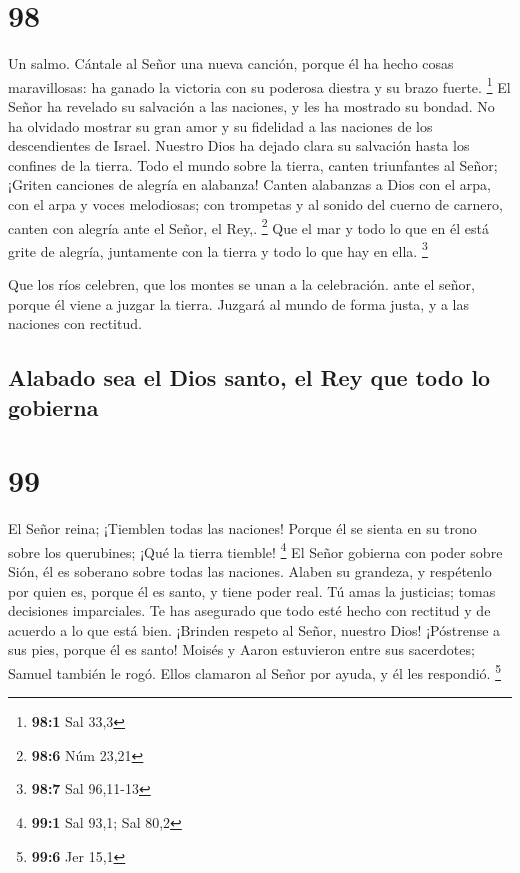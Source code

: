 \hypertarget{section-97}{%
\section{98}\label{section-97}}

Un salmo.  Cántale al Señor una nueva canción, porque él ha
hecho cosas maravillosas: ha ganado la victoria con su poderosa diestra
y su brazo fuerte. \footnote{\textbf{98:1} Sal 33,3}  El
Señor ha revelado su salvación a las naciones, y les ha mostrado su
bondad.  No ha olvidado mostrar su gran amor y su fidelidad
a las naciones de los descendientes de Israel. Nuestro Dios ha dejado
clara su salvación hasta los confines de la tierra.  Todo el
mundo sobre la tierra, canten triunfantes al Señor; ¡Griten canciones de
alegría en alabanza!  Canten alabanzas a Dios con el arpa,
con el arpa y voces melodiosas;  con trompetas y al sonido
del cuerno de carnero, canten con alegría ante el Señor, el Rey,.
\footnote{\textbf{98:6} Núm 23,21}  Que el mar y todo lo que
en él está grite de alegría, juntamente con la tierra y todo lo que hay
en ella. \footnote{\textbf{98:7} Sal 96,11-13}

 Que los ríos celebren, que los montes se unan a la
celebración.  ante el señor, porque él viene a juzgar la
tierra. Juzgará al mundo de forma justa, y a las naciones con rectitud.

\hypertarget{alabado-sea-el-dios-santo-el-rey-que-todo-lo-gobierna}{%
\subsection{Alabado sea el Dios santo, el Rey que todo lo
gobierna}\label{alabado-sea-el-dios-santo-el-rey-que-todo-lo-gobierna}}

\hypertarget{section-98}{%
\section{99}\label{section-98}}

 El Señor reina; ¡Tiemblen todas las naciones! Porque él se
sienta en su trono sobre los querubines; ¡Qué la tierra tiemble!
\footnote{\textbf{99:1} Sal 93,1; Sal 80,2}  El Señor
gobierna con poder sobre Sión, él es soberano sobre todas las naciones.
 Alaben su grandeza, y respétenlo por quien es, porque él es
santo,  y tiene poder real. Tú amas la justicias; tomas
decisiones imparciales. Te has asegurado que todo esté hecho con
rectitud y de acuerdo a lo que está bien.  ¡Brinden respeto
al Señor, nuestro Dios! ¡Póstrense a sus pies, porque él es santo!
 Moisés y Aaron estuvieron entre sus sacerdotes; Samuel
también le rogó. Ellos clamaron al Señor por ayuda, y él les respondió.
\footnote{\textbf{99:6} Jer 15,1}

